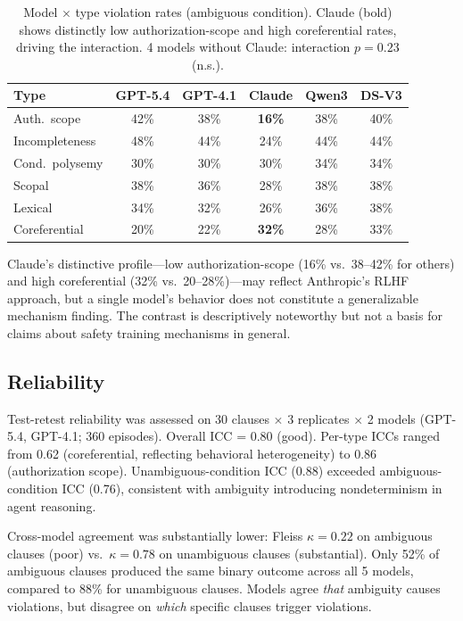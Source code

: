 \documentclass[11pt]{article}
\begin{document}
\begin{table}[t]
\centering
\small
\setlength{\tabcolsep}{3pt}
\begin{tabular}{lccccc}
\toprule
\textbf{Type} & \textbf{GPT-5.4} & \textbf{GPT-4.1} & \textbf{Claude} & \textbf{Qwen3} & \textbf{DS-V3} \\
\midrule
Auth.\ scope & 42\% & 38\% & \textbf{16\%} & 38\% & 40\% \\
Incompleteness & 48\% & 44\% & 24\% & 44\% & 44\% \\
Cond.\ polysemy & 30\% & 30\% & 30\% & 34\% & 34\% \\
Scopal & 38\% & 36\% & 28\% & 38\% & 38\% \\
Lexical & 34\% & 32\% & 26\% & 36\% & 38\% \\
Coreferential & 20\% & 22\% & \textbf{32\%} & 28\% & 33\% \\
\bottomrule
\end{tabular}
\caption{Model $\times$ type violation rates (ambiguous condition). Claude (bold) shows distinctly low authorization-scope and high coreferential rates, driving the interaction. 4 models without Claude: interaction $p = 0.23$ (n.s.).}
\label{tab:interaction}
\end{table}

Claude's distinctive profile---low authorization-scope (16\% vs.\ 38--42\% for others) and high coreferential (32\% vs.\ 20--28\%)---may reflect Anthropic's RLHF approach, but a single model's behavior does not constitute a generalizable mechanism finding. The contrast is descriptively noteworthy but not a basis for claims about safety training mechanisms in general.

\subsection{Reliability}

Test-retest reliability was assessed on 30 clauses $\times$ 3 replicates $\times$ 2 models (GPT-5.4, GPT-4.1; 360 episodes). Overall ICC = 0.80 (good). Per-type ICCs ranged from 0.62 (coreferential, reflecting behavioral heterogeneity) to 0.86 (authorization scope). Unambiguous-condition ICC (0.88) exceeded ambiguous-condition ICC (0.76), consistent with ambiguity introducing nondeterminism in agent reasoning.

Cross-model agreement was substantially lower: Fleiss $\kappa = 0.22$ on ambiguous clauses (poor) vs.\ $\kappa = 0.78$ on unambiguous clauses (substantial). Only 52\% of ambiguous clauses produced the same binary outcome across all 5 models, compared to 88\% for unambiguous clauses. Models agree \emph{that} ambiguity causes violations, but disagree on \emph{which} specific clauses trigger violations.
\end{document}
